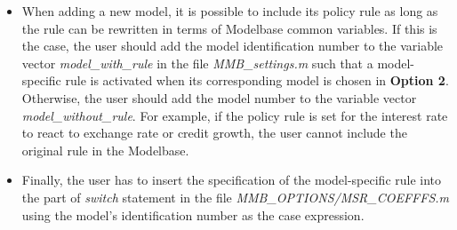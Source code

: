 \begin{itemize}
  \item When adding a new model, it is possible to include its policy rule as long as the rule can be rewritten in terms of Modelbase common variables. If this is the case, the user should add the model identification number to the variable vector \emph{model\_with\_rule} in the  file \emph{MMB\_settings.m} such that a model-specific rule is activated when its corresponding model is chosen in \textbf{Option 2}. Otherwise, the user should add the model number to the variable vector \emph{model\_without\_rule}. For example, if the policy rule is set for the interest rate to react to exchange rate or credit growth, the user cannot include the original rule in the Modelbase.
  \item Finally, the user has to insert the specification of the model-specific rule into the part of \emph{switch} statement in the file \emph{MMB\_OPTIONS/MSR\_COEFFFS.m} using the model's identification number as the case expression.
\end{itemize}


